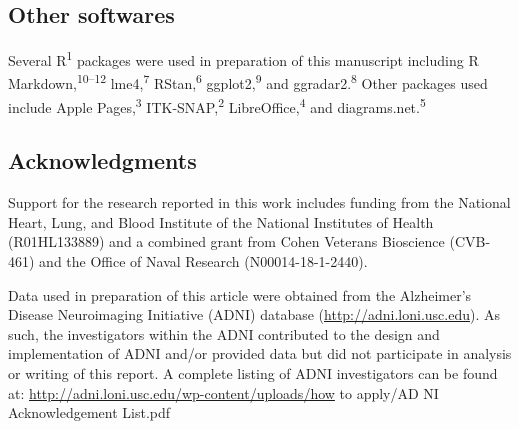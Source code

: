 \documentclass[
  12pt,
]{article}
\begin{document}
\hypertarget{other-softwares}{%
\subsection*{Other softwares}\label{other-softwares}}

Several R\textsuperscript{1} packages were used in preparation of this
manuscript including R Markdown,\textsuperscript{10--12}
lme4,\textsuperscript{7} RStan,\textsuperscript{6}
ggplot2,\textsuperscript{9} and ggradar2.\textsuperscript{8} Other
packages used include Apple Pages,\textsuperscript{3}
ITK-SNAP,\textsuperscript{2} LibreOffice,\textsuperscript{4} and
diagrams.net.\textsuperscript{5}

\clearpage

\hypertarget{acknowledgments}{%
\subsection*{Acknowledgments}\label{acknowledgments}}

Support for the research reported in this work includes funding from the
National Heart, Lung, and Blood Institute of the National Institutes of
Health (R01HL133889) and a combined grant from Cohen Veterans Bioscience
(CVB-461) and the Office of Naval Research (N00014-18-1-2440).

Data used in preparation of this article were obtained from the
Alzheimer's Disease Neuroimaging Initiative (ADNI) database
(\url{http://adni.loni.usc.edu}). As such, the investigators within the
ADNI contributed to the design and implementation of ADNI and/or
provided data but did not participate in analysis or writing of this
report. A complete listing of ADNI investigators can be found at:
\url{http://adni.loni.usc.edu/wp-content/uploads/how} to apply/AD NI
Acknowledgement List.pdf
\end{document}
